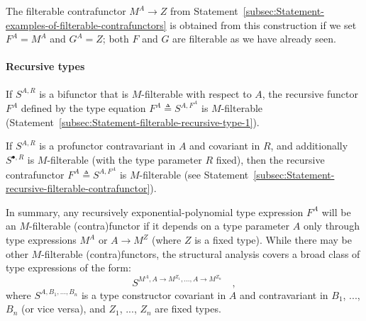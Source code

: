 The filterable contrafunctor $M^{A}\rightarrow Z$ from Statement~\ref{subsec:Statement-examples-of-filterable-contrafunctors}
is obtained from this construction if we set $F^{A}=M^{A}$ and $G^{A}=Z$;
both $F$ and $G$ are filterable as we have already seen.

\paragraph{Recursive types}

If $S^{A,R}$ is a bifunctor that is $M$-filterable with respect
to $A$, the recursive functor $F^{A}$ defined by the type equation
$F^{A}\triangleq S^{A,F^{A}}$ is $M$-filterable (Statement~\ref{subsec:Statement-filterable-recursive-type-1}).

If $S^{A,R}$ is a profunctor contravariant in
$A$ and covariant in $R$, and additionally $S^{\bullet,R}$ is $M$-filterable
(with the type parameter $R$ fixed), then the recursive contrafunctor
$F^{A}\triangleq S^{A,F^{A}}$ is $M$-filterable (see Statement~\ref{subsec:Statement-recursive-filterable-contrafunctor}).

In summary, any recursively exponential-polynomial type expression
$F^{A}$ will be an $M$-filterable (contra)functor if it depends
on a type parameter $A$ only through type expressions $M^{A}$ or
$A\rightarrow M^{Z}$ (where $Z$ is a fixed type). While there may
be other $M$-filterable (contra)functors, the structural analysis
covers a broad class of type expressions of the form:
\[
S^{M^{A},A\rightarrow M^{Z_{1}},...,A\rightarrow M^{Z_{n}}}\quad,
\]
where $S^{A,B_{1},...,B_{n}}$ is a type constructor covariant in
$A$ and contravariant in $B_{1}$, ..., $B_{n}$ (or vice versa),
and $Z_{1}$, ..., $Z_{n}$ are fixed types. 

